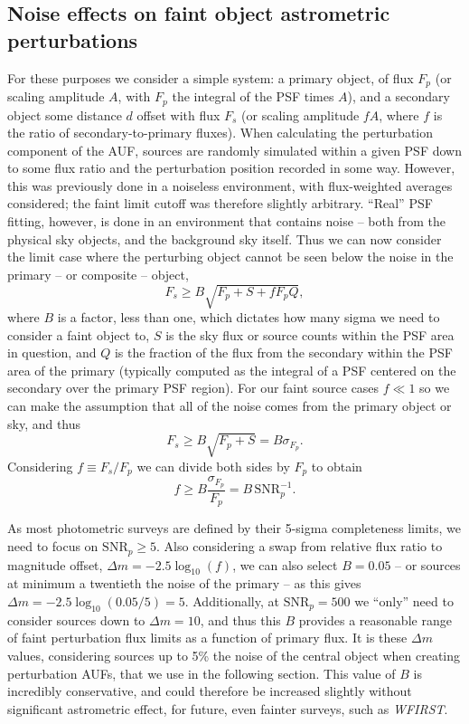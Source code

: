 \documentclass[fleqn,usenatbib]{mnras}
\begin{document}
\subsection{Noise effects on faint object astrometric perturbations}
For these purposes we consider a simple system: a primary object, of flux $F_p$ (or scaling amplitude $A$, with $F_p$ the integral of the PSF times $A$), and a secondary object some distance $d$ offset with flux $F_s$ (or scaling amplitude $fA$, where $f$ is the ratio of secondary-to-primary fluxes). When calculating the perturbation component of the AUF, sources are randomly simulated within a given PSF down to some flux ratio and the perturbation position recorded in some way. However, this was previously done in a noiseless environment, with flux-weighted averages considered; the faint limit cutoff was therefore slightly arbitrary. ``Real'' PSF fitting, however, is done in an environment that contains noise -- both from the physical sky objects, and the background sky itself. Thus we can now consider the limit case where the perturbing object cannot be seen below the noise in the primary -- or composite -- object,
\begin{equation}
    F_s \geq B\sqrt{F_p + S + fF_pQ},
\end{equation}
where $B$ is a factor, less than one, which dictates how many sigma we need to consider a faint object to, $S$ is the sky flux or source counts within the PSF area in question, and $Q$ is the fraction of the flux from the secondary within the PSF area of the primary (typically computed as the integral of a PSF centered on the secondary over the primary PSF region). For our faint source cases $f \ll 1$ so we can make the assumption that all of the noise comes from the primary object or sky, and thus
\begin{equation}
    F_s \geq B\sqrt{F_p + S} = B\sigma_{F_p}.
\end{equation}
Considering $f \equiv F_s/F_p$ we can divide both sides by $F_p$ to obtain
\begin{equation}
    f \geq B\frac{\sigma_{F_p}}{F_p} = B\,\mathrm{SNR}_p^{-1}.
\end{equation}

As most photometric surveys are defined by their 5-sigma completeness limits, we need to focus on $\mathrm{SNR}_p \geq 5$. Also considering a swap from relative flux ratio to magnitude offset, $\Delta m = -2.5 \log_{10}(f)$, we can also select $B=0.05$ -- or sources at minimum a twentieth the noise of the primary -- as this gives $\Delta m = -2.5 \log_{10}(0.05/5) = 5$. Additionally, at $\mathrm{SNR}_p = 500$ we ``only'' need to consider sources down to $\Delta m = 10$, and thus this $B$ provides a reasonable range of faint perturbation flux limits as a function of primary flux. It is these $\Delta m$ values, considering sources up to 5\% the noise of the central object when creating perturbation AUFs, that we use in the following section. This value of $B$ is incredibly conservative, and could therefore be increased slightly without significant astrometric effect, for future, even fainter surveys, such as \textit{WFIRST}.
\end{document}
